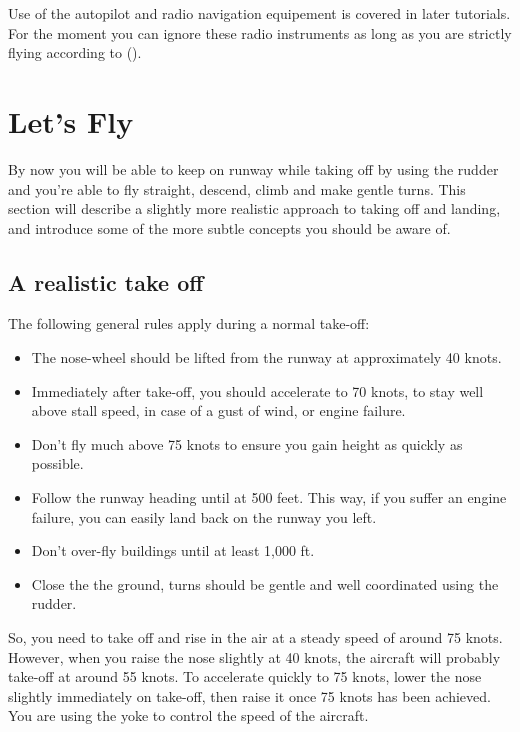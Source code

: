 Use of the autopilot and radio navigation equipement is covered in later
tutorials. For the moment you can ignore these radio instruments as
long as you are strictly flying according to  ().

\section{Let's Fly}

By now you will be able to keep on runway while
taking off by using the rudder and you're able to fly straight, descend, climb 
and make gentle turns. This section will describe a slightly more realistic
approach to taking off and landing, and introduce some of the more subtle 
concepts you should be aware of.

\subsection{A realistic take off}
\label{sec:Start}
    

The following general rules apply during a normal take-off: 
\begin{itemize}
	\item The nose-wheel should be lifted from the runway at approximately 40
  knots.
  \item Immediately after take-off, you should accelerate to 70 knots, to stay
  well above stall speed, in case of a gust of wind, or engine failure.
  \item Don't fly much above 75 knots to ensure you gain height as quickly as 
  possible.
  \item Follow the runway heading until at 500 feet. This way, if you suffer
  an engine failure, you can easily land back on the runway you left.
  \item Don't over-fly buildings until at least 1,000 ft.
	\item Close the the ground, turns should be gentle and well coordinated
  using the rudder. 
\end{itemize}

So, you need to take off and rise in the air at a steady speed of around 
75 knots. However, when you raise the nose slightly at 40 knots, the aircraft
will probably take-off at around 55 knots. To accelerate quickly to 75 knots,
lower the nose slightly immediately on take-off, then raise it once 75 knots
has been achieved. You are using the yoke to control the speed of the aircraft.

